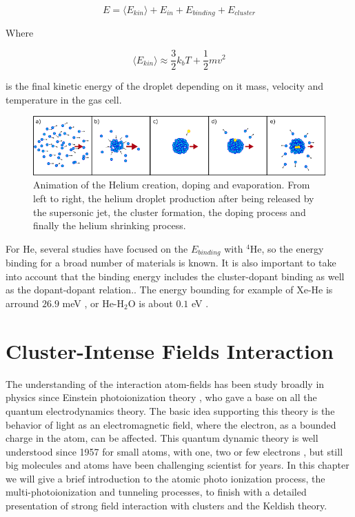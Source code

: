 \begin{equation}
E=\langle E_{kin}\rangle + E_{in} + E_{binding} + E_{cluster}
\end{equation}

Where

\begin{equation}
\langle E_{kin}\rangle \approx \dfrac{3}{2}k_{b}T + \dfrac{1}{2} m v^{2}
\end{equation}

is the final kinetic energy of the droplet depending on it mass, velocity and temperature in the gas cell.


\begin{figure}[h!]

\centering
\includegraphics[width=14cm]{../Images/He_evaporation (2).png}
\caption[Helium creation, doping and evaporation sketch]{Animation of the Helium creation, doping and evaporation. From left to right, the helium droplet production after being released by the supersonic jet, the cluster formation, the doping process and finally the helium shrinking process.}
\label{fig:shrink}
\end{figure}

For He, several studies have focused on the $E_{binding}$ with $^{4}$He, so the energy binding  for a broad number of materials is known. It is also important to take into account that the binding energy includes the cluster-dopant binding as well as the dopant-dopant relation.\cite{toennies_spectroscopy_1998}. The energy bounding for example of Xe-He is arround $26.9 $ meV \cite{lewerenz_successive_1995}, or He-H$_{2}$O is about $0.1$ eV \cite{lewis_Helium_2014}.

\section{Cluster-Intense Fields  Interaction}


The understanding of the interaction atom-fields has been study broadly in physics since Einstein photoionization theory \cite{einstein_uber_1905}, who gave a base on all the quantum electrodynamics theory. The basic idea supporting  this theory is the behavior of light as an electromagnetic field, where the electron, as a bounded charge in the atom, can be affected.  This quantum dynamic theory is well understood since 1957 for small atoms, with one, two or few electrons \cite{a._bethe_quantum_1957}, but still big molecules and atoms have been challenging scientist for years. In this chapter we will give a brief introduction to the atomic photo ionization process, the multi-photoionization and tunneling processes, to finish with a detailed presentation of strong field interaction with clusters and the Keldish theory.


